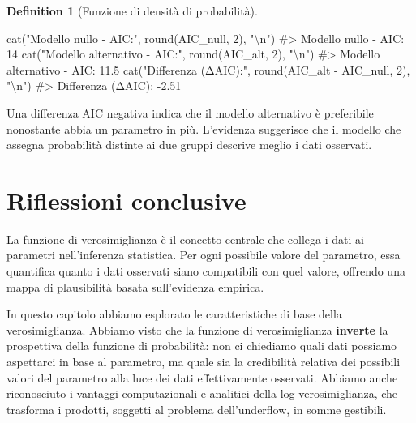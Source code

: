 \documentclass[
  letterpaper,
  DIV=11,
  numbers=noendperiod,
  oneside]{scrreprt}
\newenvironment{Shaded}{\begin{snugshade}}{\end{snugshade}}
\newcommand{\CommentTok}[1]{\textcolor[rgb]{0.37,0.37,0.37}{#1}}
\newcommand{\DecValTok}[1]{\textcolor[rgb]{0.68,0.00,0.00}{#1}}
\newcommand{\FunctionTok}[1]{\textcolor[rgb]{0.28,0.35,0.67}{#1}}
\newcommand{\NormalTok}[1]{\textcolor[rgb]{0.00,0.23,0.31}{#1}}
\newcommand{\SpecialCharTok}[1]{\textcolor[rgb]{0.37,0.37,0.37}{#1}}
\newcommand{\StringTok}[1]{\textcolor[rgb]{0.13,0.47,0.30}{#1}}
\theoremstyle{definition}
\theoremstyle{plain}
\theoremstyle{definition}
\newtheorem{definition}{Definition}[chapter]
\theoremstyle{remark}
\begin{document}
\begin{definition}[Funzione di densità di
probabilità]
\begin{Shaded}
\begin{Highlighting}[]
\FunctionTok{cat}\NormalTok{(}\StringTok{"Modello nullo {-} AIC:"}\NormalTok{, }\FunctionTok{round}\NormalTok{(AIC\_null, }\DecValTok{2}\NormalTok{), }\StringTok{"}\SpecialCharTok{\textbackslash{}n}\StringTok{"}\NormalTok{)}
\CommentTok{\#\textgreater{} Modello nullo {-} AIC: 14}
\FunctionTok{cat}\NormalTok{(}\StringTok{"Modello alternativo {-} AIC:"}\NormalTok{, }\FunctionTok{round}\NormalTok{(AIC\_alt, }\DecValTok{2}\NormalTok{), }\StringTok{"}\SpecialCharTok{\textbackslash{}n}\StringTok{"}\NormalTok{)}
\CommentTok{\#\textgreater{} Modello alternativo {-} AIC: 11.5}
\FunctionTok{cat}\NormalTok{(}\StringTok{"Differenza (ΔAIC):"}\NormalTok{, }\FunctionTok{round}\NormalTok{(AIC\_alt }\SpecialCharTok{{-}}\NormalTok{ AIC\_null, }\DecValTok{2}\NormalTok{), }\StringTok{"}\SpecialCharTok{\textbackslash{}n}\StringTok{"}\NormalTok{)}
\CommentTok{\#\textgreater{} Differenza (ΔAIC): {-}2.51}
\end{Highlighting}
\end{Shaded}

Una differenza AIC negativa indica che il modello alternativo è
preferibile nonostante abbia un parametro in più. L'evidenza suggerisce
che il modello che assegna probabilità distinte ai due gruppi descrive
meglio i dati osservati.

\section*{Riflessioni conclusive}\label{riflessioni-conclusive-12}


La funzione di verosimiglianza è il concetto centrale che collega i dati
ai parametri nell'inferenza statistica. Per ogni possibile valore del
parametro, essa quantifica quanto i dati osservati siano compatibili con
quel valore, offrendo una mappa di plausibilità basata sull'evidenza
empirica.

In questo capitolo abbiamo esplorato le caratteristiche di base della
verosimiglianza. Abbiamo visto che la funzione di verosimiglianza
\textbf{inverte} la prospettiva della funzione di probabilità: non ci
chiediamo quali dati possiamo aspettarci in base al parametro, ma quale
sia la credibilità relativa dei possibili valori del parametro alla luce
dei dati effettivamente osservati. Abbiamo anche riconosciuto i vantaggi
computazionali e analitici della log-verosimiglianza, che trasforma i
prodotti, soggetti al problema dell'underflow, in somme gestibili.


\end{definition}
\end{document}
